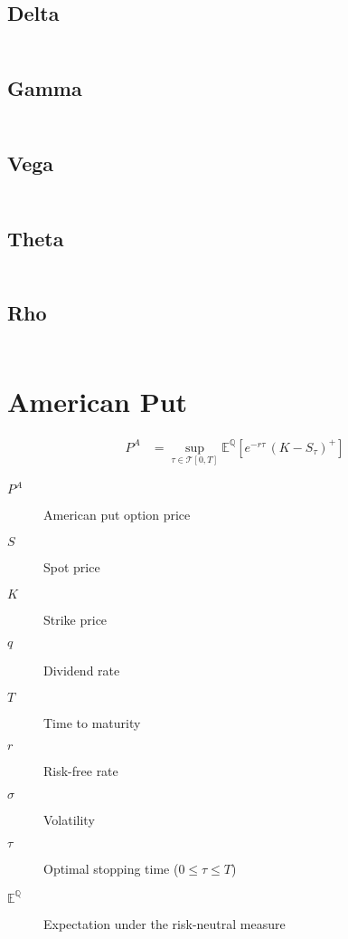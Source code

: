 \documentclass[12pt,a4paper]{article}
\begin{document}
\subsection{Delta}
\[
  \begin{aligned}
  \end{aligned}
\]

\subsection{Gamma}
\[
  \begin{aligned}
  \end{aligned}
\]

\subsection{Vega}
\[
  \begin{aligned}
  \end{aligned}
\]

\subsection{Theta}
\[
  \begin{aligned}
  \end{aligned}
\]

\subsection{Rho}
\[
  \begin{aligned}
  \end{aligned}
\]

\newpage

\section{American Put}

\[
  \begin{aligned}
    P^{A} & = \sup_{\tau \in \mathcal{T}[0,T]} \mathbb{E}^{\mathbb{Q}}\!\left[ e^{-r \tau}\,(K-S_{\tau})^{+} \right]
  \end{aligned}
\]

\begin{description}
  \item[$P^{A}$] American put option price
  \item[$S$] Spot price
  \item[$K$] Strike price
  \item[$q$] Dividend rate
  \item[$T$] Time to maturity
  \item[$r$] Risk-free rate
  \item[$\sigma$] Volatility
  \item[$\tau$] Optimal stopping time (\( 0 \le \tau \le T \))
  \item[$\mathbb{E}^{\mathbb{Q}}$] Expectation under the risk-neutral measure
\end{description}
\end{document}
